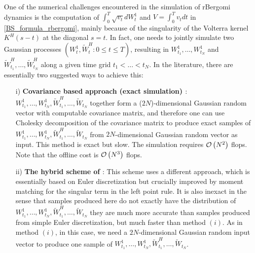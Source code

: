 One of the numerical challenges encountered in the simulation of  rBergomi dynamics  is the computation of  $\int_{0}^{T} \sqrt{v_t} dW_t^1$ and $V=\int_{0}^{T} v_t dt$ in \eqref{BS_formula_rbergomi}, mainly because of the singularity of the Volterra kernel $K^H(s-t)$ at the diagonal $s = t$. In fact,  one needs to jointly simulate two Gaussian processes $(W_t^1, \widetilde{W}^H_t: 0 \le t \le T)$, resulting in $W^1_{t_1},\dots, W^1_{t_N}$ and $\widetilde{W}^H_{t_1},\dots, \widetilde{W}^H_{t_N}$ along a given time grid $t_1 <\dots < t_N$. In the literature, there are essentially two suggested ways to achieve this:
 \begin{enumerate}
 	
 	\item[i)] \textbf{Covariance based approach (exact simulation) \cite{bayer2016pricing,bayer2018short}}: $W^1_{t_1},\dots, W^1_{t_N}, \widetilde{W}^H_{t_1},\dots, \widetilde{W}_{t_N}$ together form a ($2N$)-dimensional Gaussian random vector with  computable covariance matrix, and therefore one can use Cholesky decomposition of the covariance matrix to produce exact samples of $W^1_{t_1},\dots, W^1_{t_N}, \widetilde{W}^H_{t_1},\dots, \widetilde{W}_{t_N}$ from $2 N$-dimensional Gaussian random vector as  input. This method is exact but slow. The simulation  requires ${\mathcal{O}}\left(N^2\right)$ flops. Note that the offline cost is ${\mathcal{O}}\left(N^3\right)$ flops.
 	
 	\item[ii)]  \textbf{The hybrid scheme of \cite{bennedsen2017hybrid}}: This scheme uses a different approach, which is essentially based on  Euler discretization  but  crucially improved by moment
 	matching for the singular term in the left point rule. It is also
 	inexact in the sense that samples produced here do not exactly have the distribution of $W^1_{t_1},\dots, W^1_{t_N}, \widetilde{W}^H_{t_1},\dots, \widetilde{W}_{t_N}$ they are much more accurate than  samples produced from simple Euler discretization, but much faster than method $(i)$. As in method $(i)$, in this case, we need a $2 N$-dimensional Gaussian random input vector to produce one 	sample of $W^1_{t_1},\dots, W^1_{t_N}, \widetilde{W}^H_{t_1},\dots, \widetilde{W}_{t_N}$.
 \end{enumerate} 

